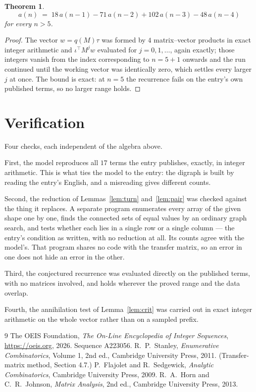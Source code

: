 \documentclass[11pt,a4paper]{article}
\theoremstyle{plain}
\newtheorem{theorem}{Theorem}
\theoremstyle{definition}
\begin{document}
\begin{theorem}
\[
a(n)\;=\;18\,a(n-1) - 71\,a(n-2) + 102\,a(n-3) - 48\,a(n-4)
\]
for every $n>5$.
\end{theorem}

\begin{proof}
The vector $w=q(M)\tau$ was formed by $4$ matrix--vector products in exact integer
arithmetic and $\iota^{\!\top}M^{j}w$ evaluated for $j=0,1,\dots$, again exactly; those
integers vanish from the index corresponding to $n=5+1$ onwards and the run continued
until the working vector was identically zero, which settles every larger $j$ at once. The bound is exact: at $n=5$ the recurrence fails on the entry's own published terms, so no larger range holds.
\end{proof}

\section{Verification}

Four checks, each independent of the algebra above.

First, the model reproduces all $17$ terms the entry publishes, exactly, in integer
arithmetic. This is what ties the model to the entry: the digraph is built by reading the
entry's English, and a misreading gives different counts.

Second, the reduction of Lemmas~\ref{lem:turn} and~\ref{lem:pair} was checked against the
thing it replaces. A separate program enumerates every array of the given shape one by one,
finds the connected sets of equal values by an ordinary graph search, and tests whether each
lies in a single row or a single column --- the entry's condition as written, with no
reduction at all. Its counts agree with the model's. That program shares no code with the
transfer matrix, so an error in one does not hide an error in the other.

Third, the conjectured recurrence was evaluated directly on the published terms, with no
matrices involved, and holds wherever the proved range and the data overlap.

Fourth, the annihilation test of Lemma~\ref{lem:crit} was carried out in exact integer
arithmetic on the whole vector rather than on a sampled prefix.

\begin{thebibliography}{9}
 The OEIS Foundation, \emph{The On-Line Encyclopedia of Integer
Sequences}, \url{https://oeis.org}, 2026. Sequence A223056.
 R.~P.~Stanley, \emph{Enumerative Combinatorics}, Volume 1, 2nd ed.,
Cambridge University Press, 2011. (Transfer-matrix method, Section 4.7.)
 P.~Flajolet and R.~Sedgewick, \emph{Analytic Combinatorics}, Cambridge
University Press, 2009.
 R.~A.~Horn and C.~R.~Johnson, \emph{Matrix Analysis}, 2nd ed., Cambridge
University Press, 2013.
\end{thebibliography}
\end{document}
